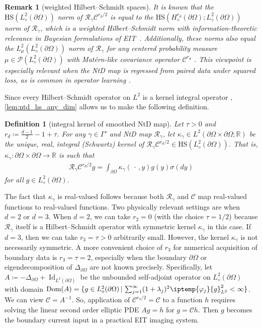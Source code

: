 \documentclass[pdflatex,sn-mathphys-num]{sn-jnl-preprint}
\newcommand{\R}{\mathbb{R}}
\newcommand{\cC}{\mathcal{C}}
\newcommand{\sP}{\mathscr{P}}
\newcommand{\pOmega}{{\partial\Omega}}
\newcommand{\ntd}{\mathscr{R}_{\gamma}}
\newcommand{\ip}{\iptemp}
\newcommand{\defeq}{\coloneqq} %
\DeclareMathOperator{\Id}{Id} %
\newcommand{\HS}{\mathrm{HS}} %
\DeclareMathOperator{\domain}{Dom} %
\newcommand{\lap}{\Delta} %
\newcommand{\slot}{{\,\cdot\,}}
\theoremstyle{thmstyleone}%
\theoremstyle{thmstyletwo}%
\newtheorem{remark}{Remark}%
\theoremstyle{thmstylethree}%
\newtheorem{definition}{Definition}%
\numberwithin{equation}{section}
\numberwithin{theorem}{section}
\begin{document}
\begin{remark}[weighted Hilbert--Schmidt spaces]
    It is known that the $\HS(L^2_\diamond(\pOmega))$ norm of $\ntd \cC^{r_d/2}$ is equal to the $\HS(H^{r_d}_\diamond(\pOmega);L^2_\diamond(\pOmega))$ norm of $\ntd$, which is a weighted Hilbert--Schmidt norm with information-theoretic relevance in Bayesian formulations of EIT~\cite{abraham2019statistical}. Additionally, these norms also equal the $L^2_\mu(L^2_\diamond(\pOmega))$ norm of $\ntd$ for any centered probability measure $\mu\in\sP(L^2_\diamond(\pOmega))$ with Mat\'ern-like covariance operator $\cC^{r_d}$ \cite[Sec.~2.2.1]{de2021convergence}. This viewpoint is especially relevant when the NtD map is regressed from paired data under squared loss, as is common in operator learning \cite{kovachki2024operator,boulle2024mathematical}.
\end{remark}

Since every Hilbert--Schmidt operator on $L^2$ is a kernel integral operator \cite[Prop.~2.8.6, p.~74]{arveson2002short}, \cref{lem:ntd_hs_any_dim} allows us to make the following definition.

\begin{definition}[integral kernel of smoothed NtD map]\label{def:kernel_integral}
    Let $\tau>0$ and $r_d\defeq \frac{d-1}{2}-1+\tau$. For any $\gamma\in\Gamma'$ and NtD map $\ntd$, let $\kappa_\gamma\in L^2(\pOmega\times\pOmega;\R)$ be the unique, real, integral (Schwartz) kernel of $\ntd \cC^{r_d/2}\in\HS(L^2_\diamond(\pOmega))$. That is, $\kappa_\gamma\colon\pOmega\times\pOmega\to\R $ is such that
    \begin{align}\label{eqn:ntd_action_as_integral}
        \ntd \cC^{r_d/2} g =\int_{\pOmega} \kappa_\gamma(\slot, y)g(y)\sigma(dy)
    \end{align}
    for all $g\in L^2_\diamond(\pOmega)$.
\end{definition}

The fact that $\kappa_\gamma$ is real-valued follows because both $\ntd$ and $\cC$ map real-valued functions to real-valued functions. Two physically relevant settings are when $d=2$ or $d=3$. When $d=2$, we can take $r_2=0$ (with the choice $\tau=1/2$) because $\ntd$ itself is a Hilbert--Schmidt operator with symmetric kernel $\kappa_\gamma$ in this case. If $d=3$, then we can take $r_3=\tau>0$ arbitrarily small. However, the kernel $\kappa_\gamma$ is not necessarily symmetric. A more convenient choice of $r_3$ for numerical acquisition of boundary data is $r_3=\tau=2$, especially when the boundary $\pOmega$ or eigendecomposition of $\lap_{\pOmega}$ are not known precisely. Specifically, let $A\defeq -\Delta_{\pOmega} + \Id_{L^2(\pOmega)}$ be the unbounded self-adjoint operator on $L^2_\diamond(\pOmega)$ with domain $\domain(A)=\{g\in L^2_\diamond(\pOmega)\,|\, \sum_{j=1}^\infty (1+\lambda_j)^2\ip{\varphi_j}{g}_{L^2}^2<\infty\}$. We can view $\cC=A^{-1}$. So, application of $\cC^{r_3/2}=\cC$ to a function $h$ requires solving the linear second order elliptic PDE $Ag=h$ for $g=\cC h$. Then $g$ becomes the boundary current input in a practical EIT imaging system.
\end{document}
